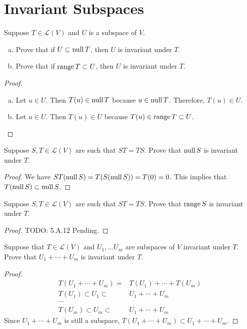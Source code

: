 \section{Invariant Subspaces}

\begin{exercise}
Suppose $T \in \mathcal{L}(V)$ and $U$ is a subspace of $V$.
\begin{enumerate}[(a)]
	\item Prove that if $U \subset \mathop{\mathrm{null}} T$, then $U$ is invariant under $T$.
	\item Prove that if $\mathop{\mathrm{range}} T \subset U$, then $U$ is invariant under $T$.
\end{enumerate}
\end{exercise}
\begin{proof}
	\begin{enumerate}[(a)]
		\item Let $u \in U$. Then $T(u) \in \mathop{\mathrm{null}} T$ because $u \in \mathop{\mathrm{null}} T$. Therefore, $T(u) \in U$.
		\item Let $u \in U$. Then $T(u) \in U$ because $T(u) \in \mathop{\mathrm{range}} T \subset U$.
	\end{enumerate}
\end{proof}

\begin{exercise}
Suppose $S,T \in \mathcal{L}(V)$ are such that $ST = TS$. Prove that $\mathop{\mathrm{null}} S$ is invariant under $T$.
\end{exercise}

\begin{proof}
	We have $ST(\mathop{\mathrm{null}} S) = T(S(\mathop{\mathrm{null}} S)) = T(0) = 0$. This implies that $T(\mathop{\mathrm{null}} S) \subset \mathop{\mathrm{null}} S$.
\end{proof}

\begin{exercise}
Suppose $S,T \in \mathcal{L}(V)$ are such that $ST = TS$. Prove that $\mathop{\mathrm{range}} S$ is invariant under $T$.
\end{exercise}

\begin{proof}
	TODO: 5.A.12 Pending.
\end{proof}

\begin{exercise}
Suppose that $T \in \mathcal{L}(V)$ and $U_1, \ldots U_m$ are subspaces of $V$ invariant under $T$. Prove that $U_1 + \cdots + U_m$ is invariant under $T$.
\end{exercise}

\begin{proof}
	\begin{align*}
		T(U_1 + \cdots+ U_m) =     & T(U_1) + \cdots + T(U_m) \\
		T(U_1) \subset U_1 \subset & U_1 + \cdots + U_m       \\
		\cdots                                                \\
		T(U_m) \subset U_m \subset & U_1 + \cdots + U_m
	\end{align*}
	Since $U_1 + \cdots + U_m$ is still a subspace, $T(U_1 + \cdots + U_m) \subset U_1 + \cdots + U_m$.
\end{proof}

